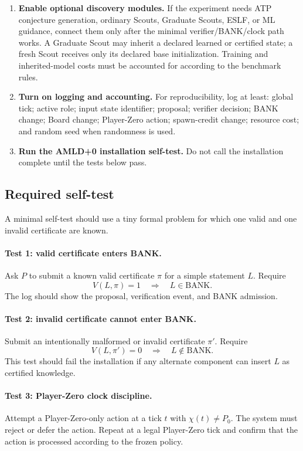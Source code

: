 \documentclass[11pt]{article}
\theoremstyle{definition}
\newcommand{\BANK}{\mathrm{BANK}}
\begin{document}
\begin{enumerate}[label=\textbf{Install \arabic*.},leftmargin=*]
\item \textbf{Enable optional discovery modules.}
If the experiment needs ATP conjecture generation, ordinary Scouts, Graduate Scouts, ESLF, or ML guidance, connect them only after the minimal verifier/BANK/clock path works. A Graduate Scout may inherit a declared learned or certified state; a fresh Scout receives only its declared base initialization. Training and inherited-model costs must be accounted for according to the benchmark rules.

\item \textbf{Turn on logging and accounting.}
For reproducibility, log at least: global tick; active role; input state identifier; proposal; verifier decision; BANK change; Board change; Player-Zero action; spawn-credit change; resource cost; and random seed when randomness is used.

\item \textbf{Run the AMLD+0 installation self-test.}
Do not call the installation complete until the tests below pass.
\end{enumerate}

\subsection{Required self-test}

A minimal self-test should use a tiny formal problem for which one valid and one invalid certificate are known.

\paragraph{Test 1: valid certificate enters BANK.}
Ask $P$ to submit a known valid certificate $\pi$ for a simple statement $L$. Require
\[
V(L,\pi)=1
\quad\Longrightarrow\quad
L\in\BANK.
\]
The log should show the proposal, verification event, and BANK admission.

\paragraph{Test 2: invalid certificate cannot enter BANK.}
Submit an intentionally malformed or invalid certificate $\pi'$. Require
\[
V(L,\pi')=0
\quad\Longrightarrow\quad
L\notin\BANK.
\]
This test should fail the installation if any alternate component can insert $L$ as certified knowledge.

\paragraph{Test 3: Player-Zero clock discipline.}
Attempt a Player-Zero-only action at a tick $t$ with $\chi(t)\neq P_0$. The system must reject or defer the action. Repeat at a legal Player-Zero tick and confirm that the action is processed according to the frozen policy.
\end{document}
